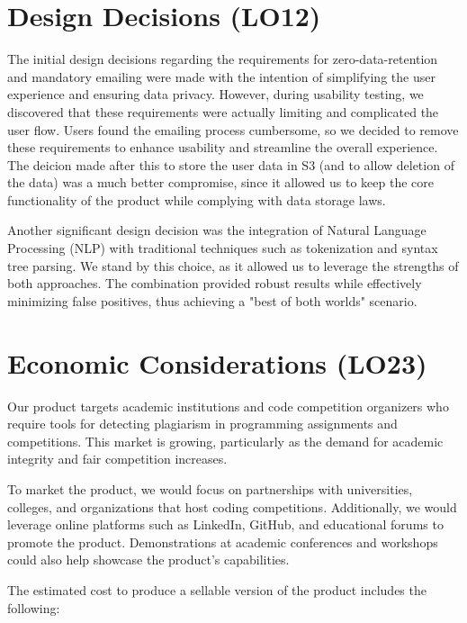 \documentclass{article}
\begin{document}
\section{Design Decisions (LO12)}

The initial design decisions regarding the requirements for zero-data-retention
and mandatory emailing were made with the intention of simplifying the user
experience and ensuring data privacy. However, during usability testing, we
discovered that these requirements were actually limiting and complicated the
user flow. Users found the emailing process cumbersome, so we decided to remove
these requirements to enhance usability and streamline the overall experience.
The deicion made after this to store the user data in S3 (and to allow deletion
of the data) was a much better compromise, since it allowed us to keep the
core functionality of the product while complying with data storage laws.

Another significant design decision was the integration of Natural Language
Processing (NLP) with traditional techniques such as tokenization and syntax tree
parsing. We stand by this choice, as it allowed us to leverage the strengths of
both approaches. The combination provided robust results while effectively
minimizing false positives, thus achieving a "best of both worlds" scenario.


\section{Economic Considerations (LO23)}

Our product targets academic institutions and code competition organizers who require tools for detecting plagiarism in programming assignments and competitions. This market is growing, particularly as the demand for academic integrity and fair competition increases.

To market the product, we would focus on partnerships with universities, colleges, and organizations that host coding competitions. Additionally, we would leverage online platforms such as LinkedIn, GitHub, and educational forums to promote the product. Demonstrations at academic conferences and workshops could also help showcase the product's capabilities.

The estimated cost to produce a sellable version of the product includes the following:
\end{document}
